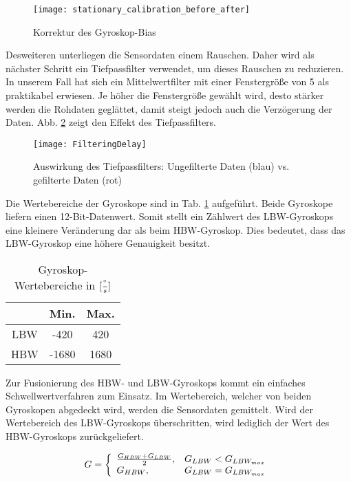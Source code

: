 \begin{figure}[h]
   \centering
   \texttt{[image: stationary\_calibration\_before\_after]}
   \caption{Korrektur des Gyroskop-Bias}
   \label{fig:gyro_bias}
\end{figure}

Desweiteren unterliegen die Sensordaten einem Rauschen. Daher wird als
nächster Schritt ein Tiefpassfilter verwendet, um dieses Rauschen zu
reduzieren. In unserem Fall hat sich ein Mittelwertfilter mit einer 
Fenstergröße von 5 als praktikabel erwiesen. Je höher die Fenstergröße gewählt wird,
desto stärker werden die Rohdaten geglättet, damit steigt jedoch auch
die Verzögerung der Daten. Abb. \ref{fig:lowpass-delay} zeigt den Effekt des Tiefpassfilters.

\begin{figure}[h]
   \centering
   \texttt{[image: FilteringDelay]}
   \caption{Auswirkung des Tiefpassfilters: Ungefilterte Daten (blau) vs. gefilterte Daten (rot)}
   \label{fig:lowpass-delay}
\end{figure}

Die Wertebereiche der Gyroskope sind
in Tab. \ref{tab:ranges-gyros} aufgeführt. Beide Gyroskope liefern
einen 12-Bit-Datenwert. Somit stellt ein Zählwert des \ac{LBW}-Gyroskops eine
kleinere Veränderung dar als beim \ac{HBW}-Gyroskop.
Dies bedeutet, dass das \ac{LBW}-Gyroskop eine höhere Genauigkeit besitzt.

\begin{table}[ht]
  \centering
  \begin{tabular}{ | c | c | c | }
    \hline
    & Min. & Max. \\ \hline
    \ac{LBW} & -420   & 420   \\ \hline
    \ac{HBW} & -1680   & 1680   \\
    \hline
  \end{tabular}
  \caption{Gyroskop-Wertebereiche in $[{\degree \over s}]$}
  \label{tab:ranges-gyros}
\end{table}


Zur Fusionierung des \ac{HBW}- und \ac{LBW}-Gyroskops kommt ein einfaches Schwellwertverfahren zum Einsatz. 
Im Wertebereich, welcher von beiden Gyroskopen abgedeckt wird, werden
die Sensordaten gemittelt. Wird der Wertebereich des \ac{LBW}-Gyroskops
überschritten, wird lediglich der Wert des \ac{HBW}-Gyroskops
zurückgeliefert.

\begin{equation}
    G = \left\{
    \begin{array}{ll}
        \frac{G_{HBW} + G_{LBW}}{2}, & G_{LBW} < G_{LBW_{max}}  \\
        G_{HBW}, & G_{LBW} = G_{LBW_{max}}
    \end{array}\right. \\
\end{equation}

